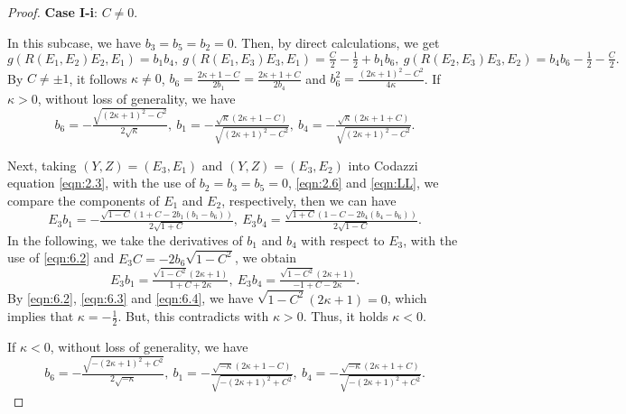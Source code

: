 \documentclass[reqno]{amsart}%
\theoremstyle{definition}
\numberwithin{equation}{section}
\begin{document}
\begin{proof}
{\bf Case I-i}: $C\neq0$.

In this subcase, we have $b_3=b_5=b_2=0$. Then, by direct calculations, we get
$$
g(R(E_1,E_2)E_2,E_1)=b_1b_4,\
g(R(E_1,E_3)E_3,E_1)=\tfrac{C}{2}-\tfrac{1}{2}+b_1b_6,\
g(R(E_2,E_3)E_3,E_2)=b_4b_6-\tfrac{1}{2}-\tfrac{C}{2}.
$$
By $C\neq\pm1$, it follows $\kappa\neq0$, $b_6=\tfrac{2\kappa+1-C}{2b_1}=\tfrac{2\kappa+1+C}{2b_4}$ 
and $b_6^2=\tfrac{(2\kappa+1)^2-C^2}{4\kappa}$. If $\kappa>0$, without loss of generality, we have
\begin{equation}\label{eqn:6.2}
b_6=-\tfrac{\sqrt{(2\kappa+1)^2-C^2}}{2\sqrt{\kappa}},\
b_1=-\tfrac{\sqrt{\kappa}(2\kappa+1-C)}{\sqrt{(2\kappa+1)^2-C^2}},
\ b_4=-\tfrac{\sqrt{\kappa}(2\kappa+1+C)}{\sqrt{(2\kappa+1)^2-C^2}}.
\end{equation}

Next, taking $(Y,Z)=(E_3,E_1)$ and $(Y,Z)=(E_3,E_2)$ into Codazzi equation \eqref{eqn:2.3},
with the use of $b_2=b_3=b_5=0$, \eqref{eqn:2.6} and \eqref{eqn:LL},
we compare the components of $E_1$ and $E_2$, respectively, then we can have
\begin{equation}\label{eqn:6.3}
E_3b_1=-\tfrac{\sqrt{1-C}(1+C-2b_1(b_1-b_6))}{2\sqrt{1+C}},\
E_3b_4=\tfrac{\sqrt{1+C}(1-C-2b_4(b_4-b_6))}{2\sqrt{1-C}}.
\end{equation}
In the following, we take the derivatives of $b_1$ and $b_4$ with respect to $E_3$,
with the use of \eqref{eqn:6.2} and $E_3C=-2b_6\sqrt{1-C^2}$, we obtain
\begin{equation}\label{eqn:6.4}
E_3b_1=\tfrac{\sqrt{1-C^2}(2\kappa+1)}{1+C+2\kappa},\
E_3b_4=\tfrac{\sqrt{1-C^2}(2\kappa+1)}{-1+C-2\kappa}.
\end{equation}
By \eqref{eqn:6.2}, \eqref{eqn:6.3} and \eqref{eqn:6.4}, we have $\sqrt{1-C^2}(2\kappa+1)=0$,
which implies that $\kappa=-\tfrac{1}{2}$.
But, this contradicts with $\kappa>0$. Thus, it holds $\kappa<0$.

If $\kappa<0$, without loss of generality, we have
\begin{equation}\label{eqn:6.5}
b_6=-\tfrac{\sqrt{-(2\kappa+1)^2+C^2}}{2\sqrt{-\kappa}},\
b_1=-\tfrac{\sqrt{-\kappa}(2\kappa+1-C)}{\sqrt{-(2\kappa+1)^2+C^2}},
\ b_4=-\tfrac{\sqrt{-\kappa}(2\kappa+1+C)}{\sqrt{-(2\kappa+1)^2+C^2}}.
\end{equation}


\end{proof}
\end{document}
